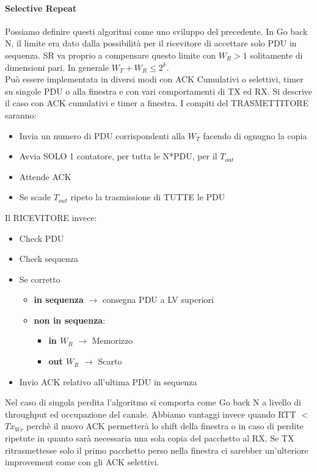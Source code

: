 \documentclass[12pt]{article}
\begin{document}
\paragraph{Selective Repeat}
Possiamo definire questi algoritmi come uno sviluppo del precedente. In Go back N, il limite era dato dalla possibilità per il ricevitore di accettare solo PDU in sequenza. SR va proprio a compensare questo limite con $W_{R}>1$ solitamente di dimensioni pari. In generale $W_{T}+W_{R}\leq2^k$.\\
Può essere implementata in diversi modi con ACK Cumulativi o selettivi, timer su singole PDU o alla finestra e con vari comportamenti di TX ed RX. Si descrive il caso con ACK cumulativi e timer a finestra.
I compiti del TRASMETTITORE saranno:
\begin{itemize}
  \item Invia un numero di PDU corrispondenti alla $W_{T}$ facendo di ognugno la copia
  \item Avvia SOLO 1 contatore, per tutta le N*PDU, per il $T_{out}$
  \item Attende ACK
  \item Se scade $T_{out}$ ripeto la trasmissione di TUTTE le PDU
\end{itemize}
Il RICEVITORE invece:
\begin{itemize}
  \item Check PDU
  \item Check sequenza
  \item Se corretto
  \begin{itemize}
    \item \textbf{in sequenza} $\rightarrow$ consegna PDU a LV superiori
    \item \textbf{non in sequenza}:
    \begin{itemize}
      \item \textbf{in $W_{R}$} $\rightarrow$ Memorizzo
      \item \textbf{out $W_{R}$} $\rightarrow$ Scarto
    \end{itemize}
  \end{itemize}
  \item Invio ACK relativo all'ultima PDU in sequenza
\end{itemize}
Nel caso di singola perdita l'algoritmo si comporta come Go back N a livello di throughput ed occupazione del canale. Abbiamo vantaggi invece quando RTT $<$ $Tx_{Wr}$ perchè il nuovo ACK permetterà lo shift della finestra o in caso di perdite ripetute in quanto sarà necessaria una sola copia del pacchetto al RX. Se TX ritrasmettesse solo il primo pacchetto perso nella finestra ci sarebber un'ulteriore improvement come con gli ACK selettivi.
\end{document}

